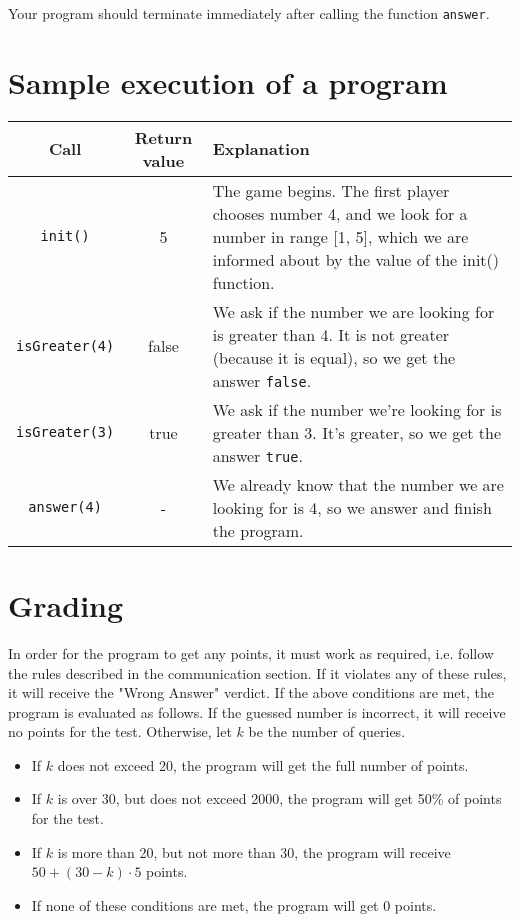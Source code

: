 \documentclass{spiral}
\begin{document}
    Your program should terminate immediately
    after calling the function \texttt{answer}.


\section{Sample execution of a program}

    \begin{tabular}{|c|c|p{12.5cm}|}
        \hline

        \textbf{Call} & \textbf{Return value} & \textbf{Explanation} \\ \hline

        \texttt{init()} & 5 &
        The game begins. The first player chooses number 4,
        and we look for a number in range [1, 5],
        which we are informed about by the value of the init() function.
        \\ \hline

        \texttt{isGreater(4)} & false &
        We ask if the number we are looking for is greater than 4.
        It is not greater (because it is equal),
        so we get the answer \texttt{false}.  
        \\ \hline

        \texttt{isGreater(3)} & true &
        We ask if the number we're looking for is greater than 3.
        It's greater, so we get the answer \texttt{true}.  
        \\ \hline

        \texttt{answer(4)} & - &
        We already know that the number we are looking for is 4,
        so we answer and finish the program.
        \\ \hline
    \end{tabular}



    \section{Grading}

    In order for the program to get any points, it must work as required,
    i.e. follow the rules described in the communication section.
    If it violates any of these rules, it will receive the "Wrong Answer" verdict.
    If the above conditions are met, the program is evaluated as follows.
    If the guessed number is incorrect, it will receive no points for the test.
    Otherwise, let $k$ be the number of queries.
    \begin{itemize}
        \item If $k$ does not exceed 20, the program will get
            the full number of points.
        \item If $k$ is over 30, but does not exceed 2000, the program will get
            50\% of points for the test.
        \item If $k$ is more than 20, but not more than 30,
            the program will receive $50 + (30 - k) \cdot 5$ points.
        \item If none of these conditions are met, the program will get 0 points.
    \end{itemize}
\end{document}
